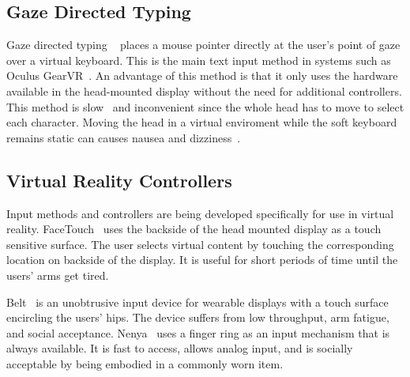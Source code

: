\subsection{Gaze Directed Typing}
Gaze directed typing ~\cite{majaranta2009text} places a mouse pointer directly at the user's point of gaze over a virtual keyboard.
This is the main text input method in systems such as Oculus GearVR~\cite{hecht2016optical}.
An advantage of this method is that it only uses the hardware available in the head-mounted display without the need for additional controllers.
This method is slow~\cite{majaranta2002twenty, card1983psychology, mackenzie1992fitts} and inconvenient since the whole head has to move to select each character.
Moving the head in a virtual enviroment while the soft keyboard remains static can causes nausea and dizziness~\cite{atienza2016interaction}.

\subsection{Virtual Reality Controllers}
Input methods and controllers are being developed specifically for use in virtual reality.
FaceTouch~\cite{Gugenheimer:2016:FTI:2851581.2890242} uses the backside of the head mounted display as a touch sensitive surface.
The user selects virtual content by touching the corresponding location on backside of the display.
It is useful for short periods of time until the users' arms get tired.

Belt~\cite{dobbelstein2015belt} is an unobtrusive input device for wearable displays with a touch surface encircling the users' hips.
The device suffers from low throughput, arm fatigue, and social acceptance.
Nenya~\cite{ashbrook2011nenya} uses a finger ring as an input mechanism that is always available.
It is fast to access, allows analog input, and is socially acceptable by being embodied in a commonly worn item.

\begin{comment}
HTC, Oculus, and Google have each released a virtual reality controller design, shown in Figure~~\ref{fig:controllers}.
They are similar in that they have rotational tracking, a way to track the thumb through either joystick or touchpad, and at least four buttons.
They are different in that HTC's Vive and Oculus' Touch controllers use an absolute tracking system to minimizing sensor drift and to allow for rotational and translational tracking~\cite{hilfert2016low}.
Google's Daydream controller is a unimanual, whereas they other two are bimanual.
Slide, the text entry system described in this paper, is implemented using the Vive.
The other two controllers also have the hardware capabilites to support Slide.
\end{comment}

